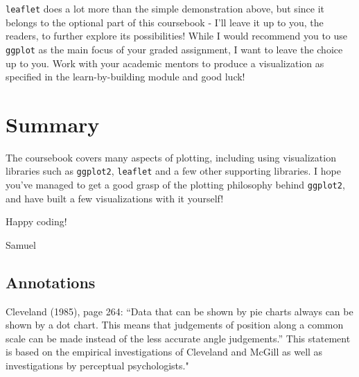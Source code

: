 \documentclass[]{article}
\begin{document}
\hypertarget{htmlwidget-89ba7edd121b3573cac8}{}
\begin{leaflet}

\end{leaflet}

\texttt{leaflet} does a lot more than the simple demonstration above,
but since it belongs to the optional part of this coursebook - I'll
leave it up to you, the readers, to further explore its possibilities!
While I would recommend you to use \texttt{ggplot} as the main focus of
your graded assignment, I want to leave the choice up to you. Work with
your academic mentors to produce a visualization as specified in the
learn-by-building module and good luck!

\hypertarget{summary}{%
\section{Summary}\label{summary}}

The coursebook covers many aspects of plotting, including using
visualization libraries such as \texttt{ggplot2}, \texttt{leaflet} and a
few other supporting libraries. I hope you've managed to get a good
grasp of the plotting philosophy behind \texttt{ggplot2}, and have built
a few visualizations with it yourself!

Happy coding!

Samuel

\hypertarget{annotations}{%
\subsection{Annotations}\label{annotations}}

Cleveland (1985), page 264: ``Data that can be shown by pie charts
always can be shown by a dot chart. This means that judgements of
position along a common scale can be made instead of the less accurate
angle judgements.'' This statement is based on the empirical
investigations of Cleveland and McGill as well as investigations by
perceptual psychologists."
\end{document}
